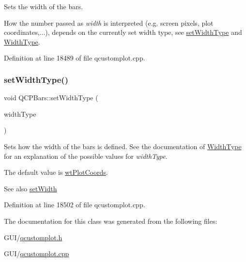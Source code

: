 Sets the width of the bars.

How the number passed as {\itshape width} is interpreted (e.\+g. screen pixels, plot coordinates,...), depends on the currently set width type, see \hyperlink{class_q_c_p_bars_adcaa3b41281bb2c0f7949b341592fcc0}{set\+Width\+Type} and \hyperlink{class_q_c_p_bars_a65dbbf1ab41cbe993d71521096ed4649}{Width\+Type}. 

Definition at line 18489 of file qcustomplot.\+cpp.

\mbox{\label{class_q_c_p_bars_adcaa3b41281bb2c0f7949b341592fcc0}} 
\subsubsection{\texorpdfstring{set\+Width\+Type()}{setWidthType()}}
{\footnotesize\ttfamily void Q\+C\+P\+Bars\+::set\+Width\+Type (\begin{DoxyParamCaption}\item[{\hyperlink{class_q_c_p_bars_a65dbbf1ab41cbe993d71521096ed4649}{Q\+C\+P\+Bars\+::\+Width\+Type}}]{width\+Type }\end{DoxyParamCaption})}

Sets how the width of the bars is defined. See the documentation of \hyperlink{class_q_c_p_bars_a65dbbf1ab41cbe993d71521096ed4649}{Width\+Type} for an explanation of the possible values for {\itshape width\+Type}.

The default value is \hyperlink{class_q_c_p_bars_a65dbbf1ab41cbe993d71521096ed4649aad3cc60ae1bfb1160a30237bee9eaf10}{wt\+Plot\+Coords}.

\begin{DoxySeeAlso}{See also}
\hyperlink{class_q_c_p_bars_afec6116579d44d5b706e0fa5e5332507}{set\+Width} 
\end{DoxySeeAlso}


Definition at line 18502 of file qcustomplot.\+cpp.



The documentation for this class was generated from the following files\+:\begin{DoxyCompactItemize}
\item 
G\+U\+I/\hyperlink{qcustomplot_8h}{qcustomplot.\+h}\item 
G\+U\+I/\hyperlink{qcustomplot_8cpp}{qcustomplot.\+cpp}\end{DoxyCompactItemize}
